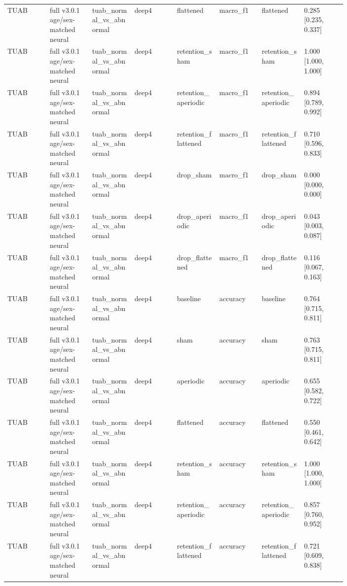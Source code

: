 \begin{longtable}{p{0.10\linewidth}p{0.10\linewidth}p{0.10\linewidth}p{0.10\linewidth}p{0.10\linewidth}p{0.10\linewidth}p{0.10\linewidth}p{0.10\linewidth}}
TUAB & full v3.0.1 age/sex-matched neural & tuab\_normal\_vs\_abnormal & deep4 & flattened & macro\_f1 & flattened & 0.285 [0.235, 0.337]\\
TUAB & full v3.0.1 age/sex-matched neural & tuab\_normal\_vs\_abnormal & deep4 & retention\_sham & macro\_f1 & retention\_sham & 1.000 [1.000, 1.000]\\
TUAB & full v3.0.1 age/sex-matched neural & tuab\_normal\_vs\_abnormal & deep4 & retention\_aperiodic & macro\_f1 & retention\_aperiodic & 0.894 [0.789, 0.992]\\
TUAB & full v3.0.1 age/sex-matched neural & tuab\_normal\_vs\_abnormal & deep4 & retention\_flattened & macro\_f1 & retention\_flattened & 0.710 [0.596, 0.833]\\
TUAB & full v3.0.1 age/sex-matched neural & tuab\_normal\_vs\_abnormal & deep4 & drop\_sham & macro\_f1 & drop\_sham & 0.000 [0.000, 0.000]\\
TUAB & full v3.0.1 age/sex-matched neural & tuab\_normal\_vs\_abnormal & deep4 & drop\_aperiodic & macro\_f1 & drop\_aperiodic & 0.043 [0.003, 0.087]\\
TUAB & full v3.0.1 age/sex-matched neural & tuab\_normal\_vs\_abnormal & deep4 & drop\_flattened & macro\_f1 & drop\_flattened & 0.116 [0.067, 0.163]\\
TUAB & full v3.0.1 age/sex-matched neural & tuab\_normal\_vs\_abnormal & deep4 & baseline & accuracy & baseline & 0.764 [0.715, 0.811]\\
TUAB & full v3.0.1 age/sex-matched neural & tuab\_normal\_vs\_abnormal & deep4 & sham & accuracy & sham & 0.763 [0.715, 0.811]\\
TUAB & full v3.0.1 age/sex-matched neural & tuab\_normal\_vs\_abnormal & deep4 & aperiodic & accuracy & aperiodic & 0.655 [0.582, 0.722]\\
TUAB & full v3.0.1 age/sex-matched neural & tuab\_normal\_vs\_abnormal & deep4 & flattened & accuracy & flattened & 0.550 [0.461, 0.642]\\
TUAB & full v3.0.1 age/sex-matched neural & tuab\_normal\_vs\_abnormal & deep4 & retention\_sham & accuracy & retention\_sham & 1.000 [1.000, 1.000]\\
TUAB & full v3.0.1 age/sex-matched neural & tuab\_normal\_vs\_abnormal & deep4 & retention\_aperiodic & accuracy & retention\_aperiodic & 0.857 [0.760, 0.952]\\
TUAB & full v3.0.1 age/sex-matched neural & tuab\_normal\_vs\_abnormal & deep4 & retention\_flattened & accuracy & retention\_flattened & 0.721 [0.609, 0.838]\\

\end{longtable}
